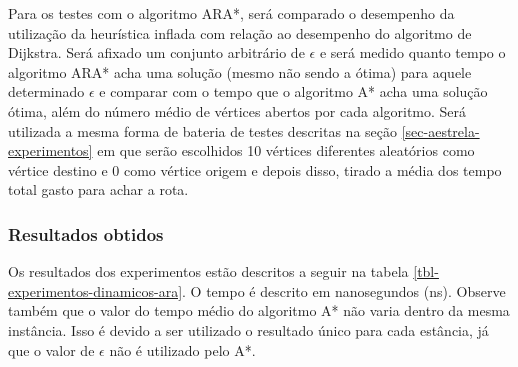 Para os testes com o algoritmo ARA*, será comparado o desempenho da utilização da heurística inflada com relação ao desempenho do algoritmo de Dijkstra. Será afixado um conjunto arbitrário de $\epsilon$ e será medido quanto tempo o algoritmo ARA* acha uma solução (mesmo não sendo a ótima) para aquele determinado $\epsilon$ e comparar com o tempo que o algoritmo A* acha uma solução ótima, além do número médio de vértices abertos por cada algoritmo. Será utilizada a mesma forma de bateria de testes descritas na seção \ref{sec-aestrela-experimentos} em que serão escolhidos 10 vértices diferentes aleatórios como vértice destino e 0 como vértice origem e depois disso, tirado a média dos tempo total gasto para achar a rota.

\subsubsection{Resultados obtidos}
\label{sec-experimentos-dinamicos-ara-resultados}

Os resultados dos experimentos estão descritos a seguir na tabela \ref{tbl-experimentos-dinamicos-ara}. O tempo é descrito em nanosegundos (ns). Observe também que o valor do tempo médio do algoritmo A* não varia dentro da mesma instância. Isso é devido a ser utilizado o resultado único para cada estância, já que o valor de $\epsilon$ não é utilizado pelo A*.

